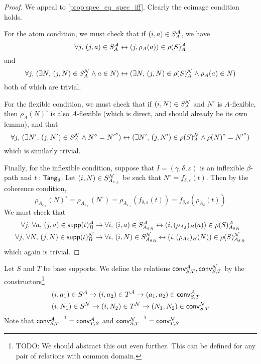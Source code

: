 \begin{proof}
  We appeal to \cref{prop:spec_eq_spec_iff}.
  Clearly the coimage condition holds.

  For the atom condition, we must check that if \( (i, a) \in S_A^{\mathcal A} \), we have
  \[ \forall j,\, (j, a) \in S_A^{\mathcal A} \leftrightarrow (j, \rho_A(a)) \in \rho(S)_A^{\mathcal A} \]
  and
  \[ \forall j,\, (\exists N,\, (j, N) \in S_A^{\mathcal N} \wedge a \in N) \leftrightarrow (\exists N,\, (j, N) \in \rho(S)_A^{\mathcal N} \wedge \rho_A(a) \in N) \]
  both of which are trivial.

  For the flexible condition, we must check that if \( (i, N) \in S_A^{\mathcal N} \) and \( N^\circ \) is \( A \)-flexible, then \( \rho_A(N)^\circ \) is also \( A \)-flexible (which is direct, and should already be its own lemma), and that
  \[ \forall j,\, (\exists N',\, (j, N') \in S_A^{\mathcal N} \wedge N^\circ = {N'}^\circ) \leftrightarrow (\exists N',\, (j, N') \in \rho(S)_A^{\mathcal N} \wedge \rho(N)^\circ = {N'}^\circ) \]
  which is similarly trivial.

  Finally, for the inflexible condition, suppose that \( I = (\gamma,\delta,\varepsilon) \) is an inflexible \( \beta \)-path and \( t : \mathsf{Tang}_\delta \).
  Let \( (i, N) \in S_{{A_\varepsilon}_\bot}^{\mathcal N} \) be such that \( N^\circ = f_{\delta,\varepsilon}(t) \).
  Then by the coherence condition,
  \[ \rho_{{A_\varepsilon}_\bot}(N)^\circ = \rho_{{A_\varepsilon}_\bot}(N^\circ) = \rho_{{A_\varepsilon}_\bot}(f_{\delta,\varepsilon}(t)) = f_{\delta,\varepsilon}(\rho_{A_\delta}(t)) \]
  We must check that
  \begin{align*}
    \forall j,\, \forall a,\, (j, a) \in \operatorname{\mathsf{supp}}(t)_B^{\mathcal A} &\to \forall i,\, (i, a) \in S_{{A_\delta}_B}^{\mathcal A} \leftrightarrow (i, (\rho_{A_\delta})_B(a)) \in \rho(S)_{{A_\delta}_B}^{\mathcal A} \\
    \forall j,\, \forall N,\, (j, N) \in \operatorname{\mathsf{supp}}(t)_B^{\mathcal N} &\to \forall i,\, (i, N) \in S_{{A_\delta}_B}^{\mathcal N} \leftrightarrow (i, (\rho_{A_\delta})_B(N)) \in \rho(S)_{{A_\delta}_B}^{\mathcal N}
  \end{align*}
  which again is trivial.
\end{proof}
\begin{definition}
  \label{def:conv_base}
  Let \( S \) and \( T \) be base supports.
  We define the relations \( \operatorname{\mathsf{conv}}_{S,T}^{\mathcal A}, \operatorname{\mathsf{conv}}_{S,T}^{\mathcal N} \) by the constructors\footnote{TODO: We should abstract this out even further. This can be defined for any pair of relations with common domain.}
  \begin{align*}
    &(i, a_1) \in S^{\mathcal A} \to (i, a_2) \in T^{\mathcal A} \to (a_1, a_2) \in \operatorname{\mathsf{conv}}_{S,T}^{\mathcal A} \\
    &(i, N_1) \in S^{\mathcal N} \to (i, N_2) \in T^{\mathcal N} \to (N_1, N_2) \in \operatorname{\mathsf{conv}}_{S,T}^{\mathcal N}
  \end{align*}
  Note that \( {\operatorname{\mathsf{conv}}_{S,T}^{\mathcal A}}^{-1} = \operatorname{\mathsf{conv}}_{T,S}^{\mathcal A} \) and \( {\operatorname{\mathsf{conv}}_{S,T}^{\mathcal N}}^{-1} = \operatorname{\mathsf{conv}}_{T,S}^{\mathcal N} \).
\end{definition}
